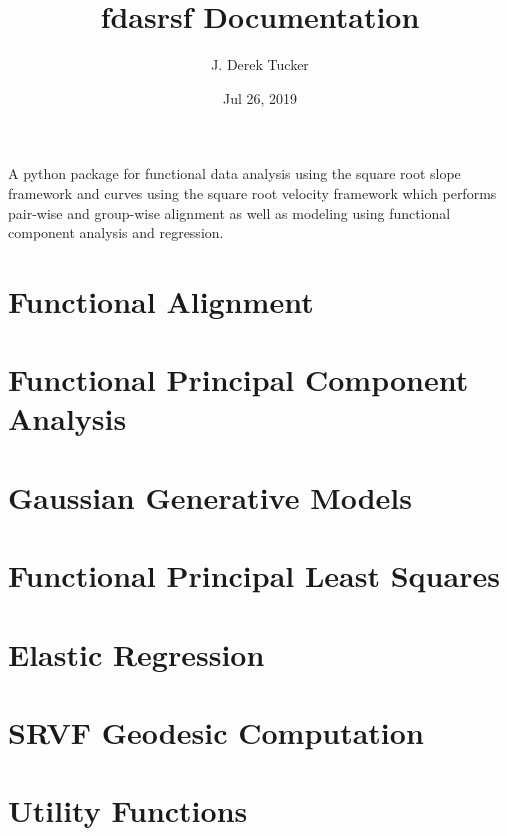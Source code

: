 \documentclass[letterpaper,10pt,english]{sphinxmanual}
\title{fdasrsf Documentation}
\date{Jul 26, 2019}
\author{J. Derek Tucker}
\begin{document}
\pagestyle{empty}
\sphinxmaketitle
\pagestyle{plain}
\sphinxtableofcontents
\pagestyle{normal}
\label{\detokenize{index::doc}}


A python package for functional data analysis using the square root
slope framework and curves using the square root velocity framework
which performs pair-wise and group-wise alignment as well as modeling
using functional component analysis and regression.


\chapter{Functional Alignment}
\label{\detokenize{time_warping:functional-alignment}}\label{\detokenize{time_warping::doc}}

\chapter{Functional Principal Component Analysis}
\label{\detokenize{fPCA:functional-principal-component-analysis}}\label{\detokenize{fPCA::doc}}

\chapter{Gaussian Generative Models}
\label{\detokenize{gauss_model:gaussian-generative-models}}\label{\detokenize{gauss_model::doc}}

\chapter{Functional Principal Least Squares}
\label{\detokenize{fPLS:functional-principal-least-squares}}\label{\detokenize{fPLS::doc}}

\chapter{Elastic Regression}
\label{\detokenize{regression:elastic-regression}}\label{\detokenize{regression::doc}}

\chapter{SRVF Geodesic Computation}
\label{\detokenize{geodesic:srvf-geodesic-computation}}\label{\detokenize{geodesic::doc}}

\chapter{Utility Functions}
\label{\detokenize{utility_functions:utility-functions}}\label{\detokenize{utility_functions::doc}}
\end{document}
